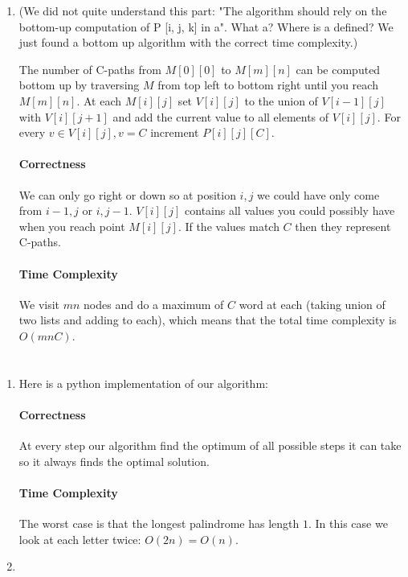 \documentclass[12pt, a4paper]{article}
\begin{document}
\begin{enumerate}[a]
	\item %
	(We did not quite understand this part: "The algorithm should rely on the bottom-up computation of P [i, j, k] in a". What a? Where is a defined? We just found a bottom up algorithm with the correct time complexity.)

	The number of C-paths from $M[0][0]$ to $M[m][n]$ can be computed bottom up by traversing $M$ from top left to bottom right until you reach $M[m][n]$. At each $M[i][j]$ set $V[i][j]$ to the union of $V[i - 1][j]$ with $V[i][j + 1]$ and add the current value to all elements of $V[i][j]$. For every $v \in V[i][j], v = C$ increment $P[i][j][C]$.

	\paragraph{Correctness}

	We can only go right or down so at position $i, j$ we could have only come from $i - 1, j$ or $i, j - 1$. $V[i][j]$ contains all values you could possibly have when you reach point $M[i][j]$. If the values match $C$ then they represent C-paths.

	\paragraph{Time Complexity}

	We visit $mn$ nodes and do a maximum of $C$ word at each (taking union of two lists and adding to each), which means that the total time complexity is $O(mnC)$.

\end{enumerate}

\section{} %
\begin{enumerate}[a]
	\item %
	Here is a python implementation of our algorithm:

	

	\paragraph{Correctness}

	At every step our algorithm find the optimum of all possible steps it can take so it always finds the optimal solution.

	\paragraph{Time Complexity}

	The worst case is that the longest palindrome has length $1$. In this case we look at each letter twice: $O(2n) = O(n)$.

	\item %
\end{enumerate}
\end{document}

